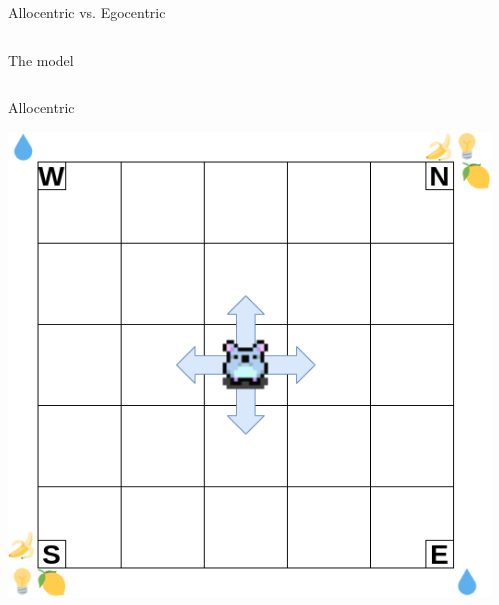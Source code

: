 \documentclass[bigger]{beamer}
\begin{document}
\begin{frame}[label={sec:orgcf978ef}]{Allocentric vs. Egocentric}
\begin{columns}
\begin{column}{0.5\columnwidth}
\begin{center}
\end{center}
\end{column}
\end{columns}
\end{frame}
\begin{frame}[label={sec:orgcc08fb9}]{The model}
\begin{columns}
\begin{column}{0.5\columnwidth}
\center
Allocentric
\begin{center}
\includegraphics[width=\textwidth]{img/RL_env-allo-model.drawio.png}
\end{center}
\end{column}
\begin{column}{0.5\columnwidth}
\end{column}
\end{columns}
\end{frame}
\end{document}
